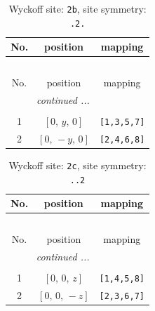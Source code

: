 \documentclass[fleqn,8pt]{jsarticle}
\begin{document}
\begin{longtable}{ccc}
\caption{Wyckoff site: {\tt 2b}, site symmetry: {\tt .2.}}
 \\
 \hline \hline
No. & position & mapping \\ \hline \endfirsthead

\multicolumn{2}{l}{\tablename\ \thetable{}} \\
 \hline \hline
No. & position & mapping \\ \hline \endhead

 \hline \hline
\multicolumn{2}{r}{\footnotesize\it continued ...} \\ \endfoot

 \hline \hline
\multicolumn{2}{r}{} \\ \endlastfoot

1 & $\left[ 0,\, y,\, 0 \right]$ & {\tt [1,3,5,7]} \\ \hline
2 & $\left[ 0,\, - y,\, 0 \right]$ & {\tt [2,4,6,8]} \\
\end{longtable}
\renewcommand{\arraystretch}{1.2}
\begin{longtable}{ccc}
\caption{Wyckoff site: {\tt 2c}, site symmetry: {\tt ..2}}
 \\
 \hline \hline
No. & position & mapping \\ \hline \endfirsthead

\multicolumn{2}{l}{\tablename\ \thetable{}} \\
 \hline \hline
No. & position & mapping \\ \hline \endhead

 \hline \hline
\multicolumn{2}{r}{\footnotesize\it continued ...} \\ \endfoot

 \hline \hline
\multicolumn{2}{r}{} \\ \endlastfoot

1 & $\left[ 0,\, 0,\, z \right]$ & {\tt [1,4,5,8]} \\ \hline
2 & $\left[ 0,\, 0,\, - z \right]$ & {\tt [2,3,6,7]} \\
\end{longtable}
\renewcommand{\arraystretch}{1.2}
\end{document}
